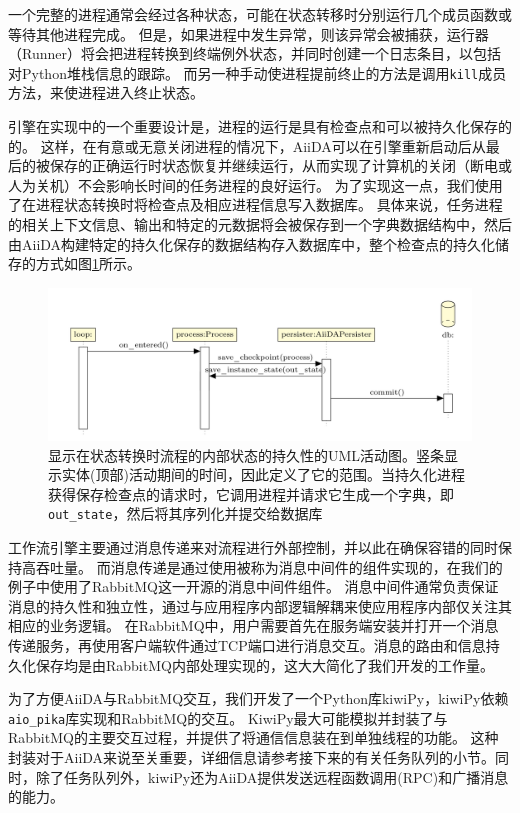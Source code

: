 一个完整的进程通常会经过各种状态，可能在状态转移时分别运行几个成员函数或等待其他进程完成。
但是，如果进程中发生异常，则该异常会被捕获，运行器（Runner）将会把进程转换到终端例外状态，并同时创建一个日志条目，以包括对Python堆栈信息的跟踪。
而另一种手动使进程提前终止的方法是调用\texttt{kill}成员方法，来使进程进入终止状态。

引擎在实现中的一个重要设计是，进程的运行是具有检查点和可以被持久化保存的的。
这样，在有意或无意关闭进程的情况下，AiiDA可以在引擎重新启动后从最后的被保存的正确运行时状态恢复并继续运行，从而实现了计算机的关闭（断电或人为关机）不会影响长时间的任务进程的良好运行。
为了实现这一点，我们使用了在进程状态转换时将检查点及相应进程信息写入数据库。
具体来说，任务进程的相关上下文信息、输出和特定的元数据将会被保存到一个字典数据结构中，然后由AiiDA构建特定的持久化保存的数据结构存入数据库中，整个检查点的持久化储存的方式如图\ref{fig:persister}所示。

\begin{figure}
  \includegraphics[width=1.0\textwidth]{figs/persister.png}
  \centering
  \caption{显示在状态转换时流程的内部状态的持久性的UML活动图。竖条显示实体(顶部)活动期间的时间，因此定义了它的范围。当持久化进程获得保存检查点的请求时，它调用进程并请求它生成一个字典，即\texttt{out\_state}，然后将其序列化并提交给数据库}
  \label{fig:persister}
\end{figure}

工作流引擎主要通过消息传递来对流程进行外部控制，并以此在确保容错的同时保持高吞吐量。
而消息传递是通过使用被称为消息中间件的组件实现的，在我们的例子中使用了RabbitMQ这一开源的消息中间件组件。
消息中间件通常负责保证消息的持久性和独立性，通过与应用程序内部逻辑解耦来使应用程序内部仅关注其相应的业务逻辑。
在RabbitMQ中，用户需要首先在服务端安装并打开一个消息传递服务，再使用客户端软件通过TCP端口进行消息交互。消息的路由和信息持久化保存均是由RabbitMQ内部处理实现的，这大大简化了我们开发的工作量。

为了方便AiiDA与RabbitMQ交互，我们开发了一个Python库kiwiPy，kiwiPy依赖\texttt{aio\_pika}库实现和RabbitMQ的交互。
KiwiPy最大可能模拟并封装了与RabbitMQ的主要交互过程，并提供了将通信信息装在到单独线程的功能。
这种封装对于AiiDA来说至关重要，详细信息请参考接下来的有关任务队列的小节。同时，除了任务队列外，kiwiPy还为AiiDA提供发送远程函数调用(RPC)和广播消息的能力。

